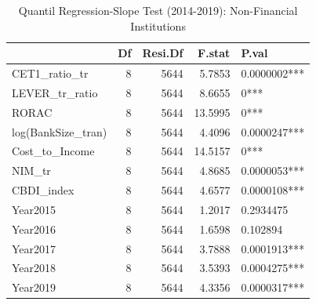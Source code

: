 \begin{table}[ht]
\centering
\caption{Quantil Regression-Slope Test (2014-2019): Non-Financial Institutions} 
\begingroup\small
\begin{tabular}{lrrrl}
  \toprule
 & Df & Resi.Df & F.stat & P.val \\ 
  \midrule
CET1\_ratio\_tr & 8 & 5644 & 5.7853 & 0.0000002*** \\ 
  LEVER\_tr\_ratio & 8 & 5644 & 8.6655 & 0*** \\ 
  RORAC & 8 & 5644 & 13.5995 & 0*** \\ 
  log(BankSize\_tran) & 8 & 5644 & 4.4096 & 0.0000247*** \\ 
  Cost\_to\_Income & 8 & 5644 & 14.5157 & 0*** \\ 
  NIM\_tr & 8 & 5644 & 4.8685 & 0.0000053*** \\ 
  CBDI\_index & 8 & 5644 & 4.6577 & 0.0000108*** \\ 
  Year2015 & 8 & 5644 & 1.2017 & 0.2934475 \\ 
  Year2016 & 8 & 5644 & 1.6598 & 0.102894 \\ 
  Year2017 & 8 & 5644 & 3.7888 & 0.0001913*** \\ 
  Year2018 & 8 & 5644 & 3.5393 & 0.0004275*** \\ 
  Year2019 & 8 & 5644 & 4.3356 & 0.0000317*** \\ 
   \bottomrule
\end{tabular}
\endgroup
\end{table}
